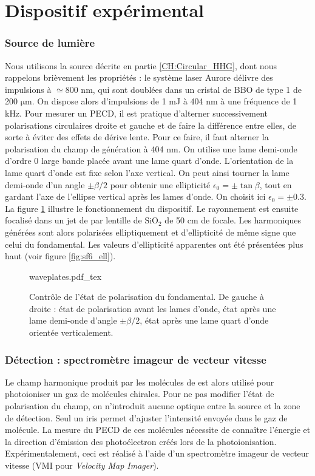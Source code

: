 \section{Dispositif expérimental}
\subsubsection{Source de lumière}
Nous utilisons la source décrite en partie \ref{CH:Circular_HHG}, dont nous rappelons brièvement les propriétés : le système laser Aurore délivre des impulsions à $\simeq$800 nm, qui sont doublées dans un cristal de BBO de type 1 de 200 $\si{\micro\metre}$. On dispose alors d'impulsions de 1 mJ à 404 nm à une fréquence de 1 kHz. Pour mesurer un PECD, il est pratique d'alterner successivement polarisations circulaires droite et gauche et de faire la différence entre elles, de sorte à éviter des effets de dérive lente. Pour ce faire, il faut alterner la polarisation du champ de génération à 404 nm. On utilise une lame demi-onde d'ordre 0 large bande placée avant une lame quart d'onde. L'orientation de la lame quart d'onde est fixe selon l'axe vertical. On peut ainsi tourner la lame demi-onde d'un angle $\pm\beta/2$ pour obtenir une ellipticité $\epsilon_0 = \pm \tan\beta$, tout en gardant l'axe de l'ellipse vertical après les lames d'onde. On choisit ici $\epsilon_0 = \pm 0.3$. La figure \ref{fig:waveplates} illustre le fonctionnement du dispositif. Le rayonnement est ensuite focalisé dans un jet de  par lentille de $\text{SiO}_2$ de 50 cm de focale. Les harmoniques générées sont alors polarisées elliptiquement et d'ellipticité de même signe que celui du fondamental. Les valeurs d'ellipticité apparentes ont été présentées plus haut (voir figure \ref{fig:sf6_ell}).

\begin{figure}[!ht]
\centering
\def\svgwidth{0.7\columnwidth}
{waveplates.pdf_tex}
\caption{Contrôle de l'état de polarisation du fondamental. De gauche à droite : état de polarisation avant les lames d'onde, état après une lame demi-onde d'angle $\pm\beta/2$, état après une lame quart d'onde orientée verticalement.}
\label{fig:waveplates}
\end{figure}

\subsubsection{Détection : spectromètre imageur de vecteur vitesse}
Le champ harmonique produit par les molécules de  est alors utilisé pour photoioniser un gaz de molécules chirales. Pour ne pas modifier l'état de polarisation du champ, on n'introduit aucune optique entre la source et la zone de détection. Seul un iris permet d'ajuster l'intensité envoyée dans le gaz de molécule. La mesure du PECD de ces molécules nécessite de connaître l'énergie et la direction d'émission des photoélectron créés lors de la photoionisation. Expérimentalement, ceci est réalisé à l'aide d'un spectromètre imageur de vecteur vitesse (VMI pour \textit{Velocity Map Imager}). 

